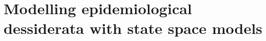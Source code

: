 
\section{Modelling epidemiological dessiderata with state space models}
\label{sec:modelling_epidemiological_dessiderata_with_state_space_models}